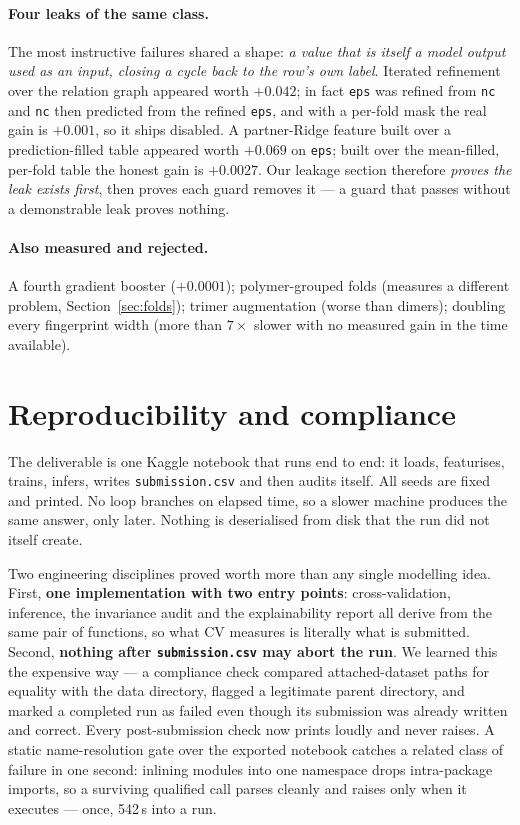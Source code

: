 \documentclass[11pt,a4paper]{article}
\newcommand{\prop}[1]{\texttt{#1}}
\begin{document}
\paragraph{Four leaks of the same class.} The most instructive failures shared a
shape: \emph{a value that is itself a model output used as an input, closing a
cycle back to the row's own label}. Iterated refinement over the relation graph
appeared worth $+0.042$; in fact \prop{eps} was refined from \prop{nc} and
\prop{nc} then predicted from the refined \prop{eps}, and with a per-fold mask
the real gain is $+0.001$, so it ships disabled. A partner-Ridge feature built
over a prediction-filled table appeared worth $+0.069$ on \prop{eps}; built over
the mean-filled, per-fold table the honest gain is $+0.0027$. Our leakage
section therefore \emph{proves the leak exists first}, then proves each guard
removes it --- a guard that passes without a demonstrable leak proves nothing.

\paragraph{Also measured and rejected.} A fourth gradient booster ($+0.0001$);
polymer-grouped folds (measures a different problem, Section~\ref{sec:folds});
trimer augmentation (worse than dimers); doubling every fingerprint width (more
than $7\times$ slower with no measured gain in the time available).

\section{Reproducibility and compliance}

The deliverable is one Kaggle notebook that runs end to end: it loads,
featurises, trains, infers, writes \texttt{submission.csv} and then audits
itself. All seeds are fixed and printed. No loop branches on elapsed time, so a
slower machine produces the same answer, only later. Nothing is deserialised
from disk that the run did not itself create.

Two engineering disciplines proved worth more than any single modelling idea.
First, \textbf{one implementation with two entry points}: cross-validation,
inference, the invariance audit and the explainability report all derive from
the same pair of functions, so what CV measures is literally what is submitted.
Second, \textbf{nothing after \texttt{submission.csv} may abort the run}. We
learned this the expensive way --- a compliance check compared attached-dataset
paths for equality with the data directory, flagged a legitimate parent
directory, and marked a completed run as failed even though its submission was
already written and correct. Every post-submission check now prints loudly and
never raises. A static name-resolution gate over the exported notebook catches a
related class of failure in one second: inlining modules into one namespace
drops intra-package imports, so a surviving qualified call parses cleanly and
raises only when it executes --- once, 542\,s into a run.
\end{document}
